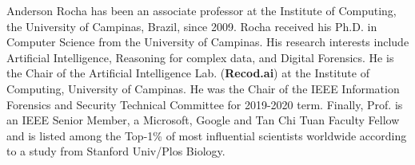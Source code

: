 \documentclass[journal]{IEEEtran}
\begin{document}
\begin{IEEEbiography}
{Anderson Rocha} has been an associate professor
at the Institute of Computing, the University of
Campinas, Brazil, since 2009. Rocha received his Ph.D. in Computer Science from the University of Campinas. His research interests include Artificial Intelligence, Reasoning for complex data, and Digital Forensics. He is the Chair of the Artificial Intelligence Lab. (\textbf{Recod.ai}) at the Institute of Computing, University of Campinas. He was the Chair of the IEEE Information Forensics and Security Technical Committee for 2019-2020 term. Finally, Prof. is an IEEE Senior Member, a Microsoft, Google and Tan Chi Tuan Faculty Fellow and is listed among the Top-1\% of most influential scientists worldwide according to a study from Stanford Univ/Plos Biology. 
\end{IEEEbiography}
\end{document}
